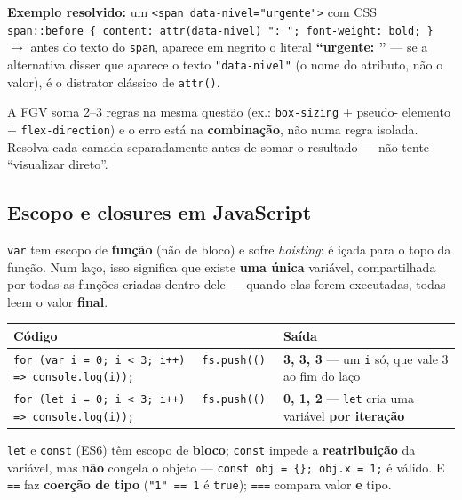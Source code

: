 \textbf{Exemplo resolvido:} um \texttt{<span data-nivel="urgente">} com CSS
\texttt{span::before \{ content: attr(data-nivel) ": "; font-weight: bold;
\}} $\to$ antes do texto do \texttt{span}, aparece em negrito o literal
\textbf{``urgente: ''} --- se a alternativa disser que aparece o texto
\texttt{"data-nivel"} (o nome do atributo, não o valor), é o distrator
clássico de \texttt{attr()}.

\begin{pegadinha}
A FGV soma 2--3 regras na mesma questão (ex.: \texttt{box-sizing} + pseudo-
elemento + \texttt{flex-direction}) e o erro está na \textbf{combinação}, não
numa regra isolada. Resolva cada camada separadamente antes de somar o
resultado --- não tente ``visualizar direto''.
\end{pegadinha}

\subsection{Escopo e closures em JavaScript}

\begin{conceito}
\texttt{var} tem escopo de \textbf{função} (não de bloco) e sofre
\textit{hoisting}: é içada para o topo da função. Num laço, isso significa
que existe \textbf{uma única} variável, compartilhada por todas as funções
criadas dentro dele --- quando elas forem executadas, todas leem o valor
\textbf{final}.

\begin{center}
\begin{tabular}{@{}p{5.4cm}p{5.4cm}@{}}
\toprule
\textbf{Código} & \textbf{Saída} \\
\midrule
\texttt{for (var i = 0; i < 3; i++)} \newline \texttt{\ \ fs.push(() => console.log(i));} & \textbf{3, 3, 3} --- um \texttt{i} só, que vale 3 ao fim do laço \\
\texttt{for (let i = 0; i < 3; i++)} \newline \texttt{\ \ fs.push(() => console.log(i));} & \textbf{0, 1, 2} --- \texttt{let} cria uma variável \textbf{por iteração} \\
\bottomrule
\end{tabular}
\end{center}
\end{conceito}

\texttt{let} e \texttt{const} (ES6) têm escopo de \textbf{bloco};
\texttt{const} impede a \textbf{reatribuição} da variável, mas \textbf{não}
congela o objeto --- \texttt{const obj = \{\}; obj.x = 1;} é válido.
E \texttt{==} faz \textbf{coerção de tipo} (\texttt{"1" == 1} é
\texttt{true}); \texttt{===} compara valor \textbf{e} tipo.

